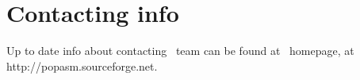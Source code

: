 \chapter{Contacting info\label{CONTACT}}
Up to date info about contacting \popasm\ team can be found at \popasm\ 
homepage, at http://popasm.sourceforge.net.
